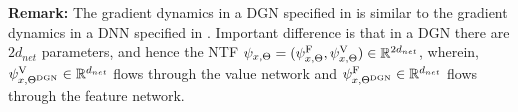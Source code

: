 \textbf{Remark:} The gradient dynamics in a DGN specified in  is similar to the gradient dynamics in a DNN specified in . Important difference is that in a DGN there are $2d_{net}$ parameters, and hence the NTF $\psi_{x,\Theta}=(\psi^{\text{F}}_{x,\Theta},\psi^{\text{V}}_{x,\Theta})\in\mathbb{R}^{2d_{net}}$, wherein, $\psi^{\text{V}}_{x,\Theta^{\text{DGN}}}\in\mathbb{R}^{d_{net}}$ flows through the value network and $\psi^{\text{F}}_{x,\Theta^{\text{DGN}}}\in\mathbb{R}^{d_{net}}$ flows through the feature network. %